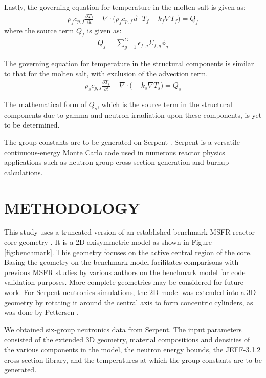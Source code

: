 \documentclass{anstrans}
\begin{document}
Lastly, the governing equation for temperature in the molten salt is given as:
\begin{align}
\rho_f c_{p,f} \frac{\partial T_f}{\partial t} + \nabla \cdot \big( \rho_f c_{p,f} \overrightarrow{u} \cdot T_f - k_f \nabla T_f \big) = Q_f \label{eq3}
\end{align}
where the source term $Q_f$ is given as:
\begin{align}
Q_f = \sum^G_{g=1} \epsilon_{f,g} \Sigma_{f,g} \phi_g \label{eq4}
\end{align}

The governing equation for temperature in the structural components is similar to that for the molten salt, with exclusion of the advection term.
\begin{align}
\rho_s c_{p,s} \frac{\partial T_s}{\partial t} + \nabla \cdot \big(- k_s \nabla T_s \big) = Q_s \label{eq5}
\end{align}

The mathematical form of $Q_s$, which is the source term in the structural components due to gamma and neutron irradiation upon these components, is yet to be determined.

The group constants are to be generated on Serpent \cite{leppanen_serpent_2015}. Serpent is a versatile continuous-energy Monte Carlo code used in numerous reactor physics applications such as neutron group cross section generation and burnup calculations.

\section{METHODOLOGY}

This study uses a truncated version of an established benchmark MSFR reactor core geometry \cite{pettersen_coupled_2016}. It is a 2D axisymmetric model as shown in Figure \ref{fig:benchmark}. This geometry focuses on the active central region of the core. Basing the geometry on the benchmark model facilitates comparisons with previous MSFR studies by various authors \cite{fiorina_modelling_2014} \cite{pettersen_coupled_2016} on the benchmark model for code validation purposes. More complete geometries may be considered for future work. For Serpent neutronics simulations, the 2D model was extended into a 3D geometry by rotating it around the central axis to form concentric cylinders, as was done by Pettersen \cite{pettersen_coupled_2016}.

We obtained six-group neutronics data from Serpent. The input parameters consisted of the extended 3D geometry, material compositions and densities of the various components in the model, the neutron energy bounds, the JEFF-3.1.2 cross section library, and the temperatures at which the group constants are to be generated.
\end{document}
